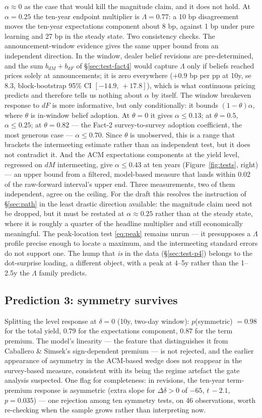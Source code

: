 \documentclass[11pt]{article}
\begin{document}
$\alpha\approx0$ as the case that would kill the magnitude claim, and it does
not hold. At $\alpha=0.25$ the ten-year endpoint multiplier is
$\Lambda=0.77$: a 10 bp disagreement moves the ten-year expectations component
about 8 bp, against 1 bp under pure learning and 27 bp in the steady state.
Two consistency checks. The announcement-window evidence gives the same upper
bound from an independent direction. In the window, dealer belief revisions are
pre-determined, and the sum $b_{dM}+b_{dF}$ of \S\ref{sec:test-fact4} would
capture $\Lambda$ only if beliefs reached prices solely at announcements; it is
zero everywhere ($+0.9$ bp per pp at 10y, se $8.3$, block-bootstrap 95\% CI
$[-14.9,\,+17.8]$), which is what continuous pricing predicts and therefore
tells us nothing about $\alpha$ by itself. The window breakeven response to
$dF$ is more informative, but only conditionally: it bounds
$(1-\theta)\alpha$, where $\theta$ is in-window belief adoption. At
$\theta=0$ it gives $\alpha\le0.13$; at $\theta=0.5$, $\alpha\le0.25$; at
$\theta=0.82$ --- the Fact-2 survey-to-survey adoption coefficient, the most
generous case --- $\alpha\le0.70$. Since $\theta$ is unobserved, this is a
range that brackets the intermeeting estimate rather than an independent test,
but it does not contradict it. And the ACM expectations components at the yield
level, regressed on $dM$ intermeeting, give $\alpha\le0.43$ at ten years
(Figure~\ref{fig:tests}, right) --- an upper bound from a filtered, model-based
measure that lands within 0.02 of the raw-forward interval's upper end.
Three measurements, two of them independent, agree on the ceiling.
For the draft this resolves the instruction of \S\ref{sec:path} in the least
drastic direction available: the magnitude claim need not be dropped, but it
must be restated at $\alpha\approx0.25$ rather than at the steady state, where
it is roughly a quarter of the headline multiplier and still economically
meaningful. The peak-location test \eqref{eq:peak} remains unrun --- it
presupposes a $\Lambda$ profile precise enough to locate a maximum, and the
intermeeting standard errors do not support one. The hump that \emph{is} in the
data (\S\ref{sec:test-p4}) belongs to the dot-surprise loading, a different
object, with a peak at 4--5y rather than the 1--2.5y the $\Lambda$ family
predicts.
\subsection{Prediction 3: symmetry survives}
\label{sec:test-sign}
Splitting the level response at $\delta=0$ (10y, two-day window):
$p$(symmetric) $=0.98$ for the total yield, $0.79$ for the expectations
component, $0.87$ for the term premium. The model's linearity --- the
feature that distinguishes it from Caballero \& Simsek's sign-dependent
premium --- is not rejected, and the earlier appearance of asymmetry in the
ACM-based wedge does not reappear in the survey-based measure, consistent
with its being the regime artefact the gate analysis suspected. One flag for
completeness: in revisions, the ten-year term-premium response is asymmetric
(extra slope for $\Delta\delta>0$ of $-65$, $t\,{-}2.1$, $p=0.035$) --- one
rejection among ten symmetry tests, on 46 observations, worth re-checking
when the sample grows rather than interpreting now.
\end{document}
